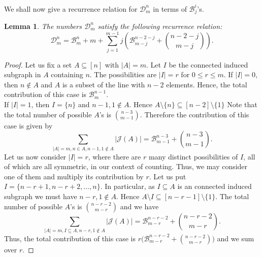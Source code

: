 \documentclass[10pt, reqno]{amsart}
\newcommand{\bgd}{\begin{displaymath}}
\newcommand{\edd}{\end{displaymath}}
\newcommand{\hf}{\hspace*{0.5cm}}
\theoremstyle{plain}
\newtheorem{lemma}[theorem]{Lemma}
\theoremstyle{remark}
\def\D{\mathcal D}
\def\B{\mathcal B}
\theoremstyle{definition}
\numberwithin{equation}{section}
\begin{document}
\hf We shall now give a recurrence relation for $\D^n_m$ in terms of $\B^i_j$'s.
\begin{lemma}
The numbers $\D^n_m$ satisfy the following recurrence relation:
\begin{equation}
	\D^n_m=\B^n_m + m+\sum_{j=1}^{m-1} j \left(\B^{n-2-j}_{m-j} + {n-2-j \choose m-j}\right).
\label{eq5}
\end{equation}
\end{lemma}
\begin{proof}
Let us fix a set $A\subseteq[n]$ with $|A|=m$. Let $I$ be the connected induced subgraph in $A$ containing $n$. The possibilities are $|I|=r$ for $0\leq r\leq m$. If $|I|=0$, then $n\notin A$ and $A$ is a subset of the line with $n-2$ elements.	
Hence, the total contribution of this case is $\B^{n-1}_m$. \\
\hf If $|I|=1$, then $I=\{n\}$ and $n-1, 1\notin A$. Hence $A\setminus\{n\}\subseteq[n-2]\setminus\{1\}$ 
Note that the total number of possible $A$'s is ${n-3 \choose m-1}$. Therefore the contribution of this case is given by
\bgd
\sum_{|A|=m, n\in A, n-1, 1\notin A}|\mathcal J(A)| =\B_{m-1}^{n-3}+{n-3 \choose m-1}.
\edd
\hf Let us now consider $|I|=r$, where there are $r$ many distinct possibilities of $I$, all of which are all symmetric, in our context of counting. Thus, we may consider one of them and multiply its contribution by $r$. Let us put $I=\{n-r+1, n-r+2, \dots, n\}$. In particular, as $I\subseteq A$ is an connected induced subgraph we must have $n-r, 1\notin A$. Hence $A\setminus I\subseteq[n-r-1]\setminus\{1\}$. The total number of possible $A$'s is ${n-r-2 \choose m-r}$ and we have
\bgd
\sum_{|A|=m, I\subseteq A, n-r, 1\notin A}|\mathcal J(A)| =\B_{m-r}^{n-r-2}+{n-r-2 \choose m-r}.
\edd
Thus, the total contribution of this case is $r\Big(\B_{m-r}^{n-r-2}+{n-r-2 \choose m-r}\Big)$ and we sum over $r$. 
\end{proof}
\end{document}

